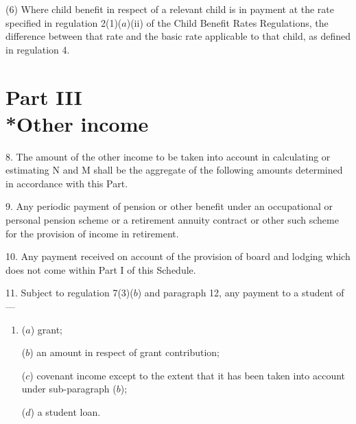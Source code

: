 \documentclass[12pt,a4paper]{article}
\begin{document}
(6) Where child benefit in respect of a relevant child is in payment at the rate specified in regulation 2(1)($a$)(ii) of the Child Benefit Rates Regulations, the difference between that rate and the basic rate applicable to that child, as defined in regulation 4.


\section[Part III --- Other income]{Part III\\*Other income}

\renewcommand\parthead{--- Schedule 1 Part III}

8.  The amount of the other income to be taken into account in calculating or estimating N and M shall be the aggregate of the following amounts determined in accordance with this Part.

\medskip

9.  Any periodic payment of pension or other benefit under an occupational or personal pension scheme or a retirement annuity contract or other such scheme for the provision of income in retirement.

\medskip

10.  Any payment received on account of the provision of board and lodging which does not come within Part I of this Schedule.

\medskip

11.  Subject to regulation 7(3)($b$) and paragraph 12, any payment to a student of—
\begin{enumerate}\item[]
($a$) grant;

($b$) an amount in respect of grant contribution;

($c$) covenant income except to the extent that it has been taken into account under sub-paragraph ($b$);

($d$) a student loan.
\end{enumerate}
\end{document}
